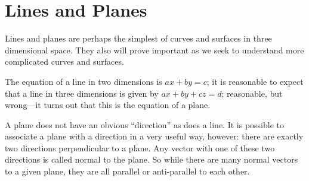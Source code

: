 \section{Lines and Planes}{}{}
\nobreak
Lines and planes are perhaps the simplest of curves and surfaces in
three dimensional space. They also will prove important as we seek to
understand more complicated curves and surfaces. 

The equation of a line in two dimensions is $ax+by=c$; it is
reasonable to expect that a line in three dimensions is
given by $ax + by +cz = d$; reasonable, but wrong---it turns out that
this is the equation of a plane.

A plane does not have an obvious ``direction'' as does a line. It is
possible to associate a plane with a direction in a very useful way,
however: there are exactly two directions perpendicular to a
plane. Any vector with one of these two directions is called {\dfont
  normal\/} to the plane.
So while there are many normal vectors to a given plane, they are all
parallel or anti-parallel to each other.

